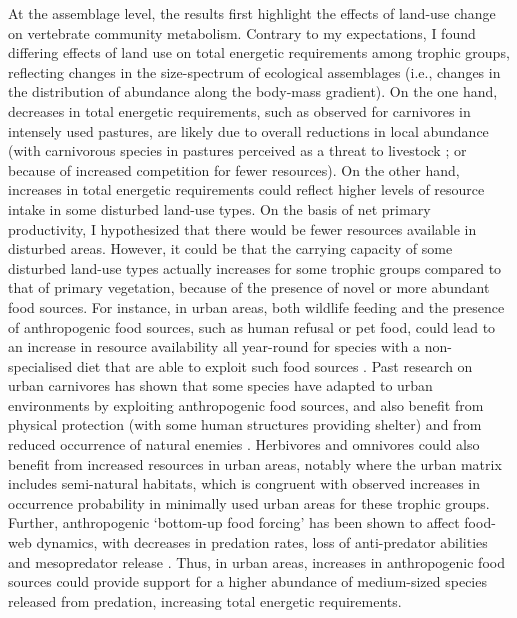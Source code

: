At the assemblage level, the results first highlight the effects of land-use change on vertebrate community metabolism. Contrary to my expectations, I found differing effects of land use on total energetic requirements among trophic groups, reflecting changes in the size-spectrum of ecological assemblages (i.e., changes in the distribution of abundance along the body-mass gradient). On the one hand, decreases in total energetic requirements, such as observed for carnivores in intensely used pastures, are likely due to overall reductions in local abundance (with carnivorous species in pastures perceived as a threat to livestock \citep{VanEeden2018}; or because of increased competition for fewer resources). On the other hand, increases in total energetic requirements could reflect higher levels of resource intake in some disturbed land-use types. On the basis of net primary productivity, I hypothesized that there would be fewer resources available in disturbed areas. However, it could be that the carrying capacity of some disturbed land-use types actually increases for some trophic groups compared to that of primary vegetation, because of the presence of novel or more abundant food sources. For instance, in urban areas, both wildlife feeding and the presence of anthropogenic food sources, such as human refusal or pet food, could lead to an increase in resource availability all year-round for species with a non-specialised diet that are able to exploit such food sources \citep{Fischer2012}.
Past research on urban carnivores has shown that some species have adapted to urban environments by exploiting anthropogenic food sources, and also benefit from physical protection (with some human structures providing shelter) and from reduced occurrence of natural enemies \citep{Bateman2012}. Herbivores and omnivores could also benefit from increased resources in urban areas, notably where the urban matrix includes semi-natural habitats, which is congruent with observed increases in occurrence probability in minimally used urban areas for these trophic groups. Further, anthropogenic `bottom-up food forcing' has been shown to affect food-web dynamics, with decreases in predation rates, loss of anti-predator abilities \citep{Geffroy2020} and mesopredator release \citep{Fischer2012}.  Thus, in urban areas, increases in anthropogenic food sources could provide support for a higher abundance of medium-sized species released from predation, increasing total energetic requirements.

